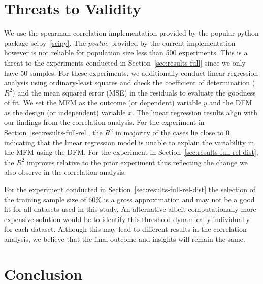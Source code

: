 \documentclass{article}
\begin{document}

\section{Threats to Validity}\label{sec:threats}

We use the spearman correlation implementation provided by the popular
python package scipy \ref{scipy}. The $pvalue$ provided by the current
implementation however is not reliable for population size less than
500 experiments. This is a threat to the experiments conducted in
Section \ref{sec:results-full} since we only have 50 samples. For
these experiments, we additionally conduct linear regression analysis
using ordinary-least squares and check the coefficient of
determination ($R^2$) and the mean squared error (MSE) in the
residuals to evaluate the goodness of fit. We set the MFM as the
outcome (or dependent) variable $y$ and the DFM as the design (or
independent) variable $x$. The linear regression results align with
our findings from the correlation analysis. For the experiment in
Section \ref{sec:results-full-rel}, the $R^2$ in majority of the cases
lie close to 0 indicating that the linear regression model is unable
to explain the variability in the MFM using the DFM. For the
experiment in Section \ref{sec:results-full-rel-dist}, the $R^2$
improves relative to the prior experiment thus reflecting the change
we also observe in the correlation analysis.


For the experiment conducted in
Section \ref{sec:results-full-rel-dist} the selection of the training
sample size of 60\% is a gross approximation and may not be a good fit
for all datasets used in this study. An alternative albeit
computationally more expensive solution would be to identify this
threshold dynamically individually for each dataset. Although this may
lead to different results in the correlation analysis, we believe that
the final outcome and insights will remain the same.



\section{Conclusion}\label{sec:conclude}



\end{document}
